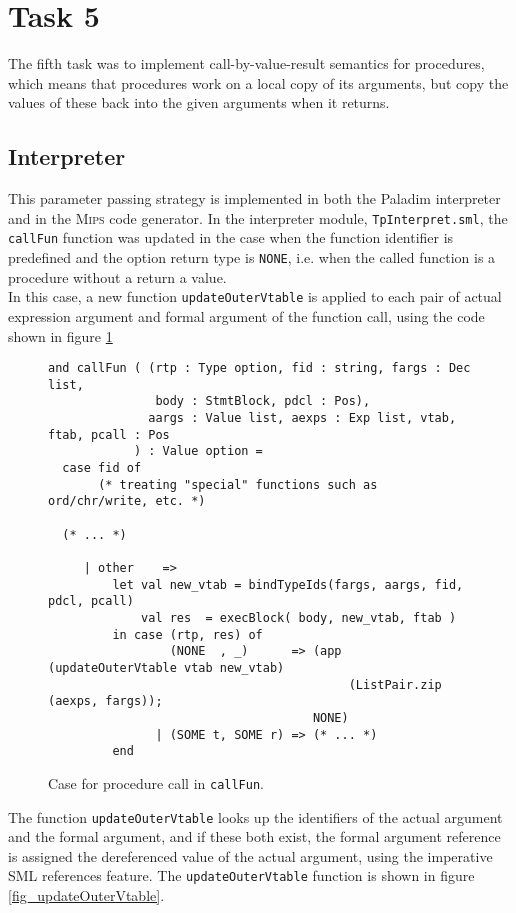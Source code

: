 \section{Task 5}
The fifth task was to implement call-by-value-result semantics for procedures,
which means that procedures work on a local copy of its arguments, but copy the
values of these back into the given arguments when it returns.

\subsection{Interpreter}
This parameter passing strategy is implemented in both the \textsf{Paladim}
interpreter and in the \textsc{Mips} code generator. In the interpreter module,
\verb|TpInterpret.sml|, the \verb|callFun| function was updated in the case when
the function identifier is predefined and the  option return type is
\verb|NONE|, i.e. when the called function is a procedure without a return a
value.\\
In this case, a new function \verb|updateOuterVtable| is applied to each pair of
actual expression argument and formal argument of the function call, using the
code shown in figure \ref{fig_callFun}
 
\begin{figure}[H]
  \begin{lstlisting}[style=MLStyle]
and callFun ( (rtp : Type option, fid : string, fargs : Dec list,
               body : StmtBlock, pdcl : Pos),
              aargs : Value list, aexps : Exp list, vtab, ftab, pcall : Pos
            ) : Value option =
  case fid of
       (* treating "special" functions such as ord/chr/write, etc. *)

  (* ... *)

     | other    =>
         let val new_vtab = bindTypeIds(fargs, aargs, fid, pdcl, pcall)
             val res  = execBlock( body, new_vtab, ftab )
         in case (rtp, res) of
                 (NONE  , _)      => (app (updateOuterVtable vtab new_vtab)
                                          (ListPair.zip (aexps, fargs));
                                     NONE)
               | (SOME t, SOME r) => (* ... *)
         end
  \end{lstlisting}
  \caption{Case for procedure call in \texttt{callFun}.}
  \label{fig_callFun}
\end{figure}

\noindent
The function \verb|updateOuterVtable| looks up the identifiers of the actual
argument and the formal argument, and if these both exist, the formal argument
reference is assigned the dereferenced value of the actual argument, using the
imperative SML references feature. The \verb|updateOuterVtable| function is
shown in figure \ref{fig_updateOuterVtable}.
 
